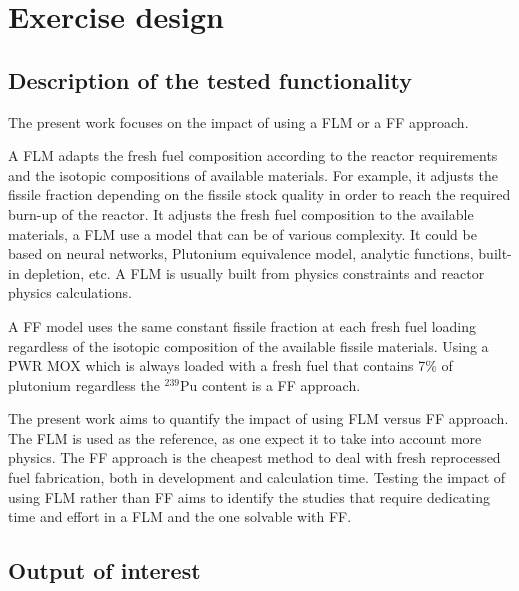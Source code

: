 \section{Exercise design}
\label{sec:exercise}
\subsection{Description of the tested functionality}

The present work focuses on the impact of using a \gls{FLM} or a \gls{FF} approach. 

A \gls{FLM} adapts the fresh fuel composition according to the reactor requirements and the isotopic compositions of available materials.
For example, it adjusts the fissile fraction depending on the fissile stock quality in order to reach the required burn-up of the reactor.
It adjusts the fresh fuel composition to the available materials, a \gls{FLM} use a model that can be of various complexity.
It could be based on neural networks, Plutonium equivalence model, analytic functions, built-in depletion, etc.
A \gls{FLM} is usually built from physics constraints and reactor physics calculations.

A \gls{FF} model uses the same constant fissile fraction at each fresh fuel loading regardless of the isotopic composition of the available fissile materials.
Using a \gls{PWR} \gls{MOX} which is always loaded with a fresh fuel that contains 7\% of plutonium regardless the $^{239}$Pu content is a \gls{FF} approach.

The present work aims to quantify the impact of using \gls{FLM} versus \gls{FF} approach. The \gls{FLM} is used as the reference, as one expect it to take into account more physics.
The \gls{FF} approach is the cheapest method to deal with fresh reprocessed fuel fabrication, both in development and calculation time.
Testing the impact of using \gls{FLM} rather than \gls{FF} aims to identify the studies that require dedicating time and effort in a \gls{FLM} and the one solvable with \gls{FF}.

\subsection{Output of interest}

